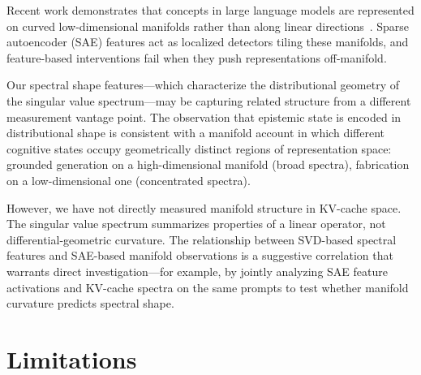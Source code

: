 \documentclass[11pt,a4paper]{article}
\begin{document}
Recent work demonstrates that concepts in large language models are
represented on curved low-dimensional manifolds rather than along
linear directions~\citep{manifold2025}. Sparse autoencoder (SAE)
features act as localized detectors tiling these manifolds, and
feature-based interventions fail when they push representations
off-manifold.

Our spectral shape features---which characterize the distributional
geometry of the singular value spectrum---may be capturing related
structure from a different measurement vantage point. The observation
that epistemic state is encoded in distributional shape is consistent
with a manifold account in which different cognitive states occupy
geometrically distinct regions of representation space: grounded
generation on a high-dimensional manifold (broad spectra), fabrication
on a low-dimensional one (concentrated spectra).

However, we have not directly measured manifold structure in KV-cache
space. The singular value spectrum summarizes properties of a linear
operator, not differential-geometric curvature. The relationship
between SVD-based spectral features and SAE-based manifold
observations is a suggestive correlation that warrants direct
investigation---for example, by jointly analyzing SAE feature
activations and KV-cache spectra on the same prompts to test whether
manifold curvature predicts spectral shape.

\section{Limitations}
\label{sec:limitations}
\end{document}
